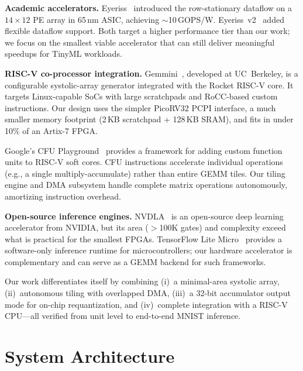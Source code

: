 \documentclass[conference]{IEEEtran}
\begin{document}
\textbf{Academic accelerators.}
Eyeriss~\cite{chen2017eyeriss} introduced the row-stationary dataflow on a $14\times12$ PE array in 65\,nm ASIC, achieving $\sim$10\,GOPS/W. Eyeriss~v2~\cite{chen2019eyeriss} added flexible dataflow support. Both target a higher performance tier than our work; we focus on the smallest viable accelerator that can still deliver meaningful speedups for TinyML workloads.

\textbf{RISC-V co-processor integration.}
Gemmini~\cite{genc2021gemmini}, developed at UC~Berkeley, is a configurable systolic-array generator integrated with the Rocket RISC-V core. It targets Linux-capable SoCs with large scratchpads and RoCC-based custom instructions. Our design uses the simpler PicoRV32 PCPI interface, a much smaller memory footprint (2\,KB scratchpad + 128\,KB SRAM), and fits in under 10\% of an Artix-7 FPGA.

Google's CFU Playground~\cite{cfu} provides a framework for adding custom function units to RISC-V soft cores. CFU instructions accelerate individual operations (e.g., a single multiply-accumulate) rather than entire GEMM tiles. Our tiling engine and DMA subsystem handle complete matrix operations autonomously, amortizing instruction overhead.

\textbf{Open-source inference engines.}
NVDLA~\cite{nvdla} is an open-source deep learning accelerator from NVIDIA, but its area ($>$100K gates) and complexity exceed what is practical for the smallest FPGAs. TensorFlow Lite Micro~\cite{tflite} provides a software-only inference runtime for microcontrollers; our hardware accelerator is complementary and can serve as a GEMM backend for such frameworks.

Our work differentiates itself by combining (i)~a minimal-area systolic array, (ii)~autonomous tiling with overlapped DMA, (iii)~a 32-bit accumulator output mode for on-chip requantization, and (iv)~complete integration with a RISC-V CPU---all verified from unit level to end-to-end MNIST inference.

\section{System Architecture}
\label{sec:arch}
\end{document}
